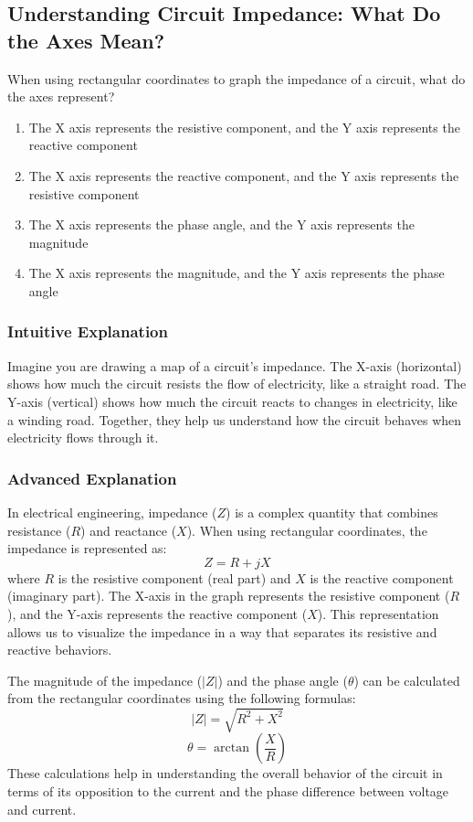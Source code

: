 \subsection{Understanding Circuit Impedance: What Do the Axes Mean?}

\begin{tcolorbox}[colback=gray!10!white,colframe=black!75!black,title=E5C09] When using rectangular coordinates to graph the impedance of a circuit, what do the axes represent?
    \begin{enumerate}[label=\Alph*)]
        \item The X axis represents the resistive component, and the Y axis represents the reactive component
        \item The X axis represents the reactive component, and the Y axis represents the resistive component
        \item The X axis represents the phase angle, and the Y axis represents the magnitude
        \item The X axis represents the magnitude, and the Y axis represents the phase angle
    \end{enumerate}
\end{tcolorbox}

\subsubsection{Intuitive Explanation}
Imagine you are drawing a map of a circuit's impedance. The X-axis (horizontal) shows how much the circuit resists the flow of electricity, like a straight road. The Y-axis (vertical) shows how much the circuit reacts to changes in electricity, like a winding road. Together, they help us understand how the circuit behaves when electricity flows through it.

\subsubsection{Advanced Explanation}
In electrical engineering, impedance (\(Z\)) is a complex quantity that combines resistance (\(R\)) and reactance (\(X\)). When using rectangular coordinates, the impedance is represented as:
\[
Z = R + jX
\]
where \(R\) is the resistive component (real part) and \(X\) is the reactive component (imaginary part). The X-axis in the graph represents the resistive component (\(R\)), and the Y-axis represents the reactive component (\(X\)). This representation allows us to visualize the impedance in a way that separates its resistive and reactive behaviors.

The magnitude of the impedance (\(|Z|\)) and the phase angle (\(\theta\)) can be calculated from the rectangular coordinates using the following formulas:
\[
|Z| = \sqrt{R^2 + X^2}
\]
\[
\theta = \arctan\left(\frac{X}{R}\right)
\]
These calculations help in understanding the overall behavior of the circuit in terms of its opposition to the current and the phase difference between voltage and current.

